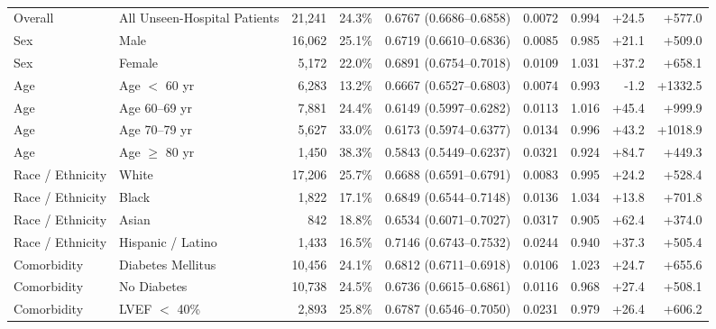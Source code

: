 \begin{table}[t]
\centering\tablefont
\caption{}
\label{tab:supp_subgroups}
\setlength{\tabcolsep}{3.6pt}
\renewcommand{\arraystretch}{0.98}
\begin{tabularx}{\textwidth}{@{}L{2.0cm}Yrrrrrrr@{}}
\toprule
{} &  &  &  &  &  &  &  &  \\
\midrule
Overall & All Unseen-Hospital Patients & 21,241 & 24.3\% & 0.6767 (0.6686--0.6858) & 0.0072 & 0.994 & +24.5 & +577.0 \\
Sex & Male & 16,062 & 25.1\% & 0.6719 (0.6610--0.6836) & 0.0085 & 0.985 & +21.1 & +509.0 \\
Sex & Female & 5,172 & 22.0\% & 0.6891 (0.6754--0.7018) & 0.0109 & 1.031 & +37.2 & +658.1 \\
Age & Age $<$ 60 yr & 6,283 & 13.2\% & 0.6667 (0.6527--0.6803) & 0.0074 & 0.993 & -1.2 & +1332.5 \\
Age & Age 60--69 yr & 7,881 & 24.4\% & 0.6149 (0.5997--0.6282) & 0.0113 & 1.016 & +45.4 & +999.9 \\
Age & Age 70--79 yr & 5,627 & 33.0\% & 0.6173 (0.5974--0.6377) & 0.0134 & 0.996 & +43.2 & +1018.9 \\
Age & Age $\ge$ 80 yr & 1,450 & 38.3\% & 0.5843 (0.5449--0.6237) & 0.0321 & 0.924 & +84.7 & +449.3 \\
Race / Ethnicity & White & 17,206 & 25.7\% & 0.6688 (0.6591--0.6791) & 0.0083 & 0.995 & +24.2 & +528.4 \\
Race / Ethnicity & Black & 1,822 & 17.1\% & 0.6849 (0.6544--0.7148) & 0.0136 & 1.034 & +13.8 & +701.8 \\
Race / Ethnicity & Asian & 842 & 18.8\% & 0.6534 (0.6071--0.7027) & 0.0317 & 0.905 & +62.4 & +374.0 \\
Race / Ethnicity & Hispanic / Latino & 1,433 & 16.5\% & 0.7146 (0.6743--0.7532) & 0.0244 & 0.940 & +37.3 & +505.4 \\
Comorbidity & Diabetes Mellitus & 10,456 & 24.1\% & 0.6812 (0.6711--0.6918) & 0.0106 & 1.023 & +24.7 & +655.6 \\
Comorbidity & No Diabetes & 10,738 & 24.5\% & 0.6736 (0.6615--0.6861) & 0.0116 & 0.968 & +27.4 & +508.1 \\
Comorbidity & LVEF $<$ 40\% & 2,893 & 25.8\% & 0.6787 (0.6546--0.7050) & 0.0231 & 0.979 & +26.4 & +606.2 \\

\end{tabularx}
\end{table}
